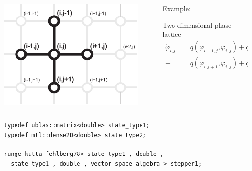 \begin{frame}[fragile]

 \vspace{1ex}
 \begin{columns}[T]
  \begin{column}{0.35\textwidth}
   \centerline{\includegraphics[draft=false,width=0.9\textwidth]{2dlattice.pdf}}
  \end{column}
  \begin{column}{0.58\textwidth}
Example: 

\vspace{1ex}
Two-dimensional phase lattice
\begin{align*}
\dot{\varphi}_{i,j} = &
  q(\varphi_{i+1,j},\varphi_{i,j}) 
 + q(\varphi_{i-1,j},\varphi_{i,j}) \\
 + & q(\varphi_{i,j+1},\varphi_{i,j}) 
 + q(\varphi_{i,j-1},\varphi_{i,j})
 \end{align*}
  \end{column}
 \end{columns}

\vspace{1ex}

\begin{lstlisting}[basicstyle=\scriptsize\ttfamily]
typedef ublas::matrix<double> state_type1;
typedef mtl::dense2D<double> state_type2;

runge_kutta_fehlberg78< state_type1 , double ,
  state_type1 , double , vector_space_algebra > stepper1;
\end{lstlisting}

\pause
\vspace{1ex}



\end{frame}
